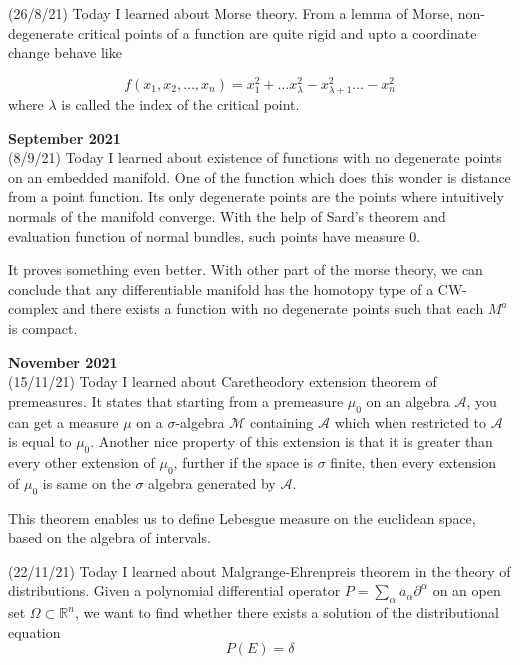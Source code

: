 \documentclass[12pt,a4paper]{article}
\newcommand{\R}{\mathbb{R}}
\begin{document}
  
  (26/8/21) Today I learned about Morse theory. From a lemma of Morse, non-degenerate critical points of a function are quite rigid and upto a coordinate change behave like 
  
  \[ f(x_1,x_2,\ldots,x_n) = x_1^2 + \ldots x_\lambda^2 - x_{\lambda+1}^2 \ldots - x_n^2 \]
   where $\lambda$ is called the index of the critical point.\\
   
    \maketitle\textbf{September 2021}
   \\
   
   (8/9/21) Today I learned about existence of functions with no degenerate points on an embedded manifold. One of the function which does this wonder is distance from a point function. Its only degenerate points are the points where intuitively normals of the manifold converge. With the help of Sard's theorem and evaluation function of normal bundles, such points have measure 0. 
   
   It proves something even better. With other part of the morse theory, we can conclude that any differentiable manifold has the homotopy type of a CW-complex and there exists a function with no degenerate points such that each $M^a$ is compact.\\
   
     \maketitle\textbf{November 2021}
   \\
   
   (15/11/21) Today I learned about Caretheodory extension theorem of premeasures. It states that starting from a premeasure  $\mu_0$ on an algebra $\mathcal{A}$, you can get a measure $\mu$ on a $\sigma$-algebra $\mathcal{M}$ containing $\mathcal{A}$ which when restricted to $\mathcal{A}$ is equal to $\mu_0$. Another nice property of this extension is that it is greater than every other extension of $\mu_0$, further if the space is $\sigma$ finite, then every extension of $\mu_0$ is same on the $\sigma$ algebra generated by $\mathcal{A}$.
   
   This theorem enables us to define Lebesgue measure on the euclidean space, based on the algebra of intervals. 
   
   (22/11/21)  Today I learned about Malgrange-Ehrenpreis theorem in the theory of distributions. Given a polynomial differential operator $P = \sum_{\alpha} a_\alpha\partial^{\alpha}$ on an open set $\Omega \subset \R^n$, we want to find whether there exists a solution of the distributional equation 
\begin{equation}
   P(E) = \delta \label{MET} 
\end{equation}
   
\end{document}
